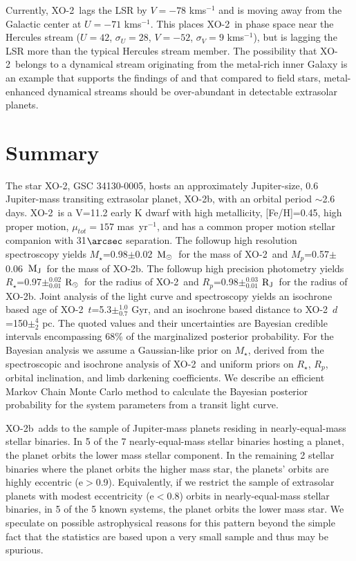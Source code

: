\documentclass{emulateapj}
\newcommand{\Msun}{${\rm M_\odot}$}
\newcommand{\Rsun}{${\rm R_\odot}$}
\newcommand{\Mjup}{${\rm M_J}$}
\newcommand{\xonb}{XO-2b}
\newcommand{\xon}{XO-2}
\newcommand{\Rjup}{${\rm R_J}$}
\newcommand{\vMs}{0.98}
\newcommand{\eMs}{0.02}
\newcommand{\vRs}{0.97}
\newcommand{\epRs}{0.02}
\newcommand{\enRs}{0.01}
\newcommand{\vDs}{150}
\newcommand{\epDs}{4}
\newcommand{\enDs}{2}
\newcommand{\vMp}{0.57}
\newcommand{\eMp}{0.06}
\newcommand{\vRp}{0.98}
\newcommand{\epRp}{0.03}
\newcommand{\enRp}{0.01}
\newcommand{\vAge}{5.3}
\newcommand{\epAge}{1.0}
\newcommand{\enAge}{0.7}
\newcommand{\vSepas}{31}
\newcommand{\vFeH}{0.45}
\begin{document}
Currently, \xon\ lags the LSR by $V=-78$ kms$^{-1}$ and is moving away
from the Galactic center at $U=-71$ kms$^{-1}$.  This places \xon\ in
phase space near the Hercules stream
\citep{FAM05,ECU07} ($U=42$, $\sigma_{U}=28$, $V=-52$, $\sigma_{V}=9$
kms$^{-1}$), but is lagging the LSR more than the typical Hercules
stream member.  The possibility that \xon\ belongs to a dynamical
stream originating from the metal-rich inner Galaxy is an
example that supports the findings of \citet{FAM05} and \citet{ECU07}
that compared to field stars, metal-enhanced dynamical streams should
be over-abundant in detectable extrasolar planets.


\section{Summary}\label{sec:sum}

The star \xon, GSC 34130-0005, hosts an approximately Jupiter-size, 0.6 Jupiter-mass transiting extrasolar planet, \xonb, with an orbital
period $\sim$2.6 days.  \xon\ is a V=11.2 early K dwarf with high
metallicity, [Fe/H]=\vFeH, high proper motion, $\mu_{tot}=157$
mas~yr$^{-1}$, and has a common proper motion stellar companion with
\vSepas $\arcsec$ separation.  The followup high resolution
spectroscopy yields $M_{\star}$=\vMs $\pm$\eMs\ \Msun\ for the mass
of \xon\ and $M_{p}$=\vMp$\pm$\eMp\ \Mjup\ for the mass of \xonb.
The followup high precision photometry yields
$R_{\star}$=\vRs$\pm^{\epRs}_{\enRs}$ \Rsun\ for the radius of \xon\
and $R_{p}$=\vRp$\pm^{\epRp}_{\enRp}$ \Rjup\ for the radius of
\xonb.  Joint analysis of the light curve and spectroscopy yields an
isochrone based age of \xon\, $t$=\vAge$\pm^{\epAge}_{\enAge}$ Gyr,
and an isochrone based distance to \xon\,
$d$=\vDs$\pm^{\epDs}_{\enDs}$ pc.  The quoted values and their uncertainties are
Bayesian credible intervals encompassing 68\% of the marginalized
posterior probability.  For the Bayesian analysis we assume a
Gaussian-like prior on $M_{\star}$, derived from the spectroscopic and
isochrone analysis of
\xon\, and uniform priors on $R_{\star}$, $R_{p}$, orbital
inclination, and limb darkening coefficients.  We describe an
efficient Markov Chain Monte Carlo method to calculate the Bayesian
posterior probability for the system parameters from a transit light
curve.

\xonb\ adds to the sample of Jupiter-mass planets residing in
nearly-equal-mass stellar binaries.  In 5 of the 7 nearly-equal-mass
stellar binaries hosting a planet, the planet orbits the lower mass
stellar component.  In the remaining 2 stellar binaries where the
planet orbits the higher mass star, the planets' orbits are highly
eccentric (e$>$0.9).  Equivalently, if we restrict the sample of
extrasolar planets with modest eccentricity (e$<$0.8) orbits in
nearly-equal-mass stellar binaries, in 5 of the 5 known systems, the
planet orbits the lower mass star.  We speculate on possible
astrophysical reasons for this pattern beyond the simple fact that the
statistics are based upon a very small sample and thus may be
spurious.
\end{document}
